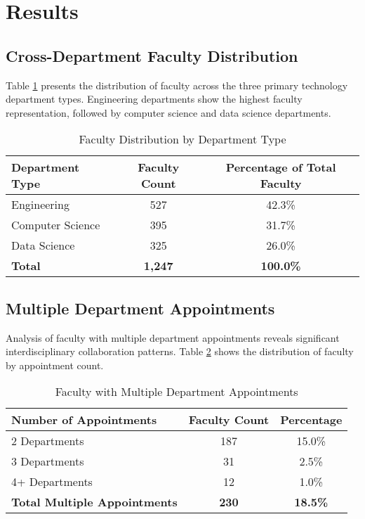 \documentclass[12pt]{article}
\begin{document}
\section{Results}

\subsection{Cross-Department Faculty Distribution}

Table \ref{tab:cross_dept_distribution} presents the distribution of faculty across the three primary technology department types. Engineering departments show the highest faculty representation, followed by computer science and data science departments.

\begin{table}[h]
\centering
\caption{Faculty Distribution by Department Type}
\label{tab:cross_dept_distribution}
\begin{tabular}{lcc}
\toprule
\textbf{Department Type} & \textbf{Faculty Count} & \textbf{Percentage of Total Faculty} \\
\midrule
Engineering & 527 & 42.3\% \\
Computer Science & 395 & 31.7\% \\
Data Science & 325 & 26.0\% \\
\midrule
\textbf{Total} & \textbf{1,247} & \textbf{100.0\%} \\
\bottomrule
\end{tabular}
\end{table}

\subsection{Multiple Department Appointments}

Analysis of faculty with multiple department appointments reveals significant interdisciplinary collaboration patterns. Table \ref{tab:multiple_appointments} shows the distribution of faculty by appointment count.

\begin{table}[h]
\centering
\caption{Faculty with Multiple Department Appointments}
\label{tab:multiple_appointments}
\begin{tabular}{lcc}
\toprule
\textbf{Number of Appointments} & \textbf{Faculty Count} & \textbf{Percentage} \\
\midrule
2 Departments & 187 & 15.0\% \\
3 Departments & 31 & 2.5\% \\
4+ Departments & 12 & 1.0\% \\
\midrule
\textbf{Total Multiple Appointments} & \textbf{230} & \textbf{18.5\%} \\
\bottomrule
\end{tabular}
\end{table}
\end{document}
